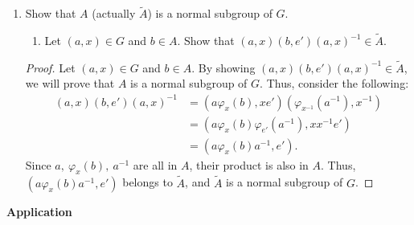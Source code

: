 \documentclass[12pt, oneside]{book}
\newcommand{\pf}[1]{
    \begin{customframedproof}[linecolor=orangehdx!75]
        \begin{proof}
        #1
        \end{proof}
    \end{customframedproof}
}
\begin{document}
\begin{enumerate}
    \item Show that \(A\) (actually \(\tilde{A}\)) is a normal subgroup of \(G\).
    \begin{enumerate}
        \item Let \((a,x) \in G\) and \(b \in A\). Show that \((a,x)(b,e')(a,x)^{-1} \in \tilde{A}\).
    \end{enumerate}
    \pf{
        Let \((a,x) \in G\) and \(b \in A\). By showing \((a,x)(b,e')(a,x)^{-1} \in \tilde{A}\), we will prove that \(A\) is a normal subgroup of \(G\). Thus, consider the following:
        \begin{align*}
            (a,x)(b,e')(a,x)^{-1} &= (a\varphi_{x}(b), xe')(\varphi_{x^{-1}}(a^{-1}),x^{-1}) \\ 
            &= (a \varphi_{x}(b) \varphi_{e'}(a^{-1}), xx^{-1}e') \\
            &= (a \varphi_{x}(b) a^{-1}, e').
        \end{align*}
        Since \(a, \ \varphi_{x}(b), \ a^{-1}\) are all in \(A\), their product is also in \(A\). Thus, \((a \varphi_{x}(b) a^{-1}, e')\) belongs to \(\tilde{A}\), and \(\tilde{A}\) is a normal subgroup of \(G\). 
    }
\end{enumerate}
\textbf{Application}

\end{document}
